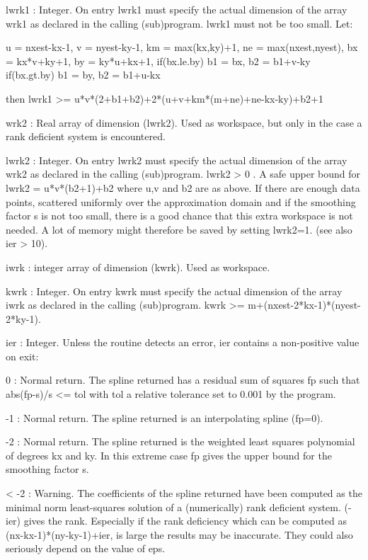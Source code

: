 \documentclass[11pt,twoside,nolof]{starlink}
\begin{document}
\begin{terminalv}
   lwrk1 : Integer. On entry lwrk1 must specify the actual dimension of
           the array wrk1 as declared in the calling (sub)program.
           lwrk1 must not be too small. Let:

             u = nxest-kx-1, v = nyest-ky-1, km = max(kx,ky)+1,
             ne = max(nxest,nyest), bx = kx*v+ky+1, by = ky*u+kx+1,
             if(bx.le.by) b1 = bx, b2 = b1+v-ky
             if(bx.gt.by) b1 = by, b2 = b1+u-kx

           then
             lwrk1 >= u*v*(2+b1+b2)+2*(u+v+km*(m+ne)+ne-kx-ky)+b2+1

   wrk2  : Real array of dimension (lwrk2). Used as workspace, but
           only in the case a rank deficient system is encountered.

   lwrk2 : Integer. On entry lwrk2 must specify the actual dimension of
           the array wrk2 as declared in the calling (sub)program.
           lwrk2 > 0 . A safe upper bound for lwrk2 = u*v*(b2+1)+b2
           where u,v and b2 are as above. If there are enough data
           points, scattered uniformly over the approximation domain
           and if the smoothing factor s is not too small, there is a
           good chance that this extra workspace is not needed. A lot
           of memory might therefore be saved by setting lwrk2=1.
           (see also ier > 10).

   iwrk  : integer array of dimension (kwrk). Used as workspace.

   kwrk  : Integer. On entry kwrk must specify the actual dimension of
           the array iwrk as declared in the calling (sub)program.
           kwrk >= m+(nxest-2*kx-1)*(nyest-2*ky-1).

   ier   : Integer. Unless the routine detects an error, ier contains a
           non-positive value on exit:

           0 : Normal return. The spline returned has a residual sum of
               squares fp such that abs(fp-s)/s <= tol with tol a
               relative tolerance set to 0.001 by the program.

          -1 : Normal return. The spline returned is an interpolating
               spline (fp=0).

          -2 : Normal return. The spline returned is the weighted least
               squares polynomial of degrees kx and ky. In this extreme
               case fp gives the upper bound for the smoothing factor s.

        < -2 : Warning. The coefficients of the spline returned have been
               computed as the minimal norm least-squares solution of a
               (numerically) rank deficient system. (-ier) gives the rank.
               Especially if the rank deficiency which can be computed as
               (nx-kx-1)*(ny-ky-1)+ier, is large the results may be
               inaccurate. They could also seriously depend on the value of
               eps.


\end{terminalv}
\end{document}
